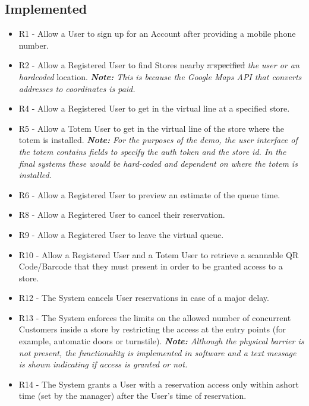 \documentclass[
]{article}
\begin{document}
\hypertarget{implemented}{%
\subsection{Implemented}\label{implemented}}

\begin{itemize}

\item
  R1 - Allow a User to sign up for an Account after providing a mobile
  phone number.
\item
  R2 - Allow a Registered User to find Stores nearby \sout{a specified} \emph{the user or an hardcoded}
  location. \emph{\textbf{Note: }This is because the Google Maps API that converts addresses to coordinates is paid.}
\item
  R4 - Allow a Registered User to get in the virtual line at a
  specified store.
\item
  R5 - Allow a Totem User to get in the virtual line of the store where
  the totem is installed. \emph{\textbf{Note:} For the purposes of the demo, the user interface of the totem contains fields to specify the auth token and the store id. In the final systems these would be hard-coded and dependent on where the totem is installed.}
\item
  R6 - Allow a Registered User to preview an estimate of the queue time.
\item
  R8 - Allow a Registered User to cancel their reservation.
\item
  R9 - Allow a Registered User to leave the virtual queue.
\item
  R10 - Allow a Registered User and a Totem User to retrieve a
  scannable QR Code/Barcode that they must present in order to be
  granted access to a store.
\item
  R12 - The System cancels User reservations in case of a major delay.
\item
  R13 - The System enforces the limits on the allowed number of
  concurrent Customers inside a store by restricting the access at
  the entry points (for example, automatic doors or turnstile).
  \emph{\textbf{Note:} Although the physical barrier is not present, the functionality is implemented in software and a text message is shown indicating if access is granted or not.}
\item
  R14 - The System grants a User with a reservation access only within
  ashort time (set by the manager) after the User's time of reservation.
\end{itemize}
\end{document}

